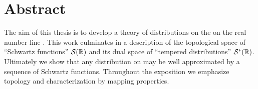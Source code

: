 \chapter*{Abstract}
  The aim of this thesis is to develop a theory of distributions on the on the real number line \R.
  This work culminates in a description of the topological space of ``Schwartz functions'' $\mathcal{S}(\mathbb{R})$ and its dual space of ``tempered distributions'' $\mathcal{S}^*(\mathbb{R})$.
  Ultimately we show that any distribution on \R may be well approximated by a sequence of Schwartz functions.
  Throughout the exposition we emphasize topology and characterization by mapping properties.
